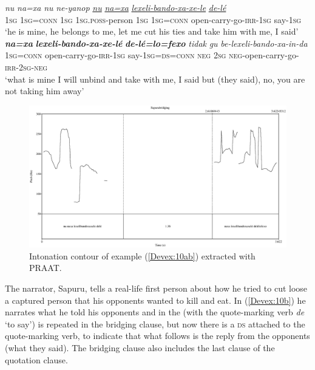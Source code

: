 \documentclass[output=paper]{LSP/langsci}
\begin{document}
\begin{exe}
\ex \label{Devex:10ab}
\begin{xlist}
\ex \label{Devex:10a}		
\gll \textit{nu}	\textit{na=xa} \textit{nu} \textit{ne-yanop} \underline{\textit{nu}} \underline{\textit{na=xa}} \underline{\textit{lexeli-bando-xa-xe-le}} \underline{\textit{de-lé}}\\
\textsc{1sg}	\textsc{1sg=conn} \textsc{1sg} \textsc{1sg.poss}-person	\textsc{1sg}	\textsc{1sg=conn} open-carry-go-\textsc{irr-1sg} say-\textsc{1sg}\\
\glt `he is mine, he belongs to me, let me cut his ties and take him with me, I said'\\

\ex \label{Devex:10b}		
\gll \textbf{\textit{na=xa}} \textbf{\textit{lexeli-bando-xa-xe-lé}}	\textbf{\textit{de-lé=lo=fexo}} \textit{tidak}	\textit{gu} \textit{be-lexeli-bando-xa-in-da}\\	
\textsc{1sg=conn} open-carry-go-\textsc{irr-1sg} say-\textsc{1sg=ds=conn} \textsc{neg} \textsc{2sg} \textsc{neg}-open-carry-go-\textsc{irr-2sg-neg}\\
\glt `what is mine I will unbind and take with me, I said but (they said), no, you are not taking him away'\\
\end{xlist}
\end{exe}


\begin{figure}
\includegraphics[width=\textwidth]{figures/devriesFig1.eps}
\caption{Intonation contour of example (\ref{Devex:10ab}) extracted with PRAAT. \label{DevF1}}
\end{figure}


The narrator, Sapuru, tells a real-life first person  about how he tried to cut loose a captured person that his opponents wanted to kill and eat. In (\ref{Devex:10b}) he narrates what he told his opponents and in  the  (with the quote-marking verb \textit{de} `to say') is repeated in the bridging clause, but now there is a \textsc{ds}  attached to the quote-marking verb, to indicate that what follows is the reply from the opponents (what they said). The bridging clause also includes the last clause of the quotation clause. 
\end{document}
